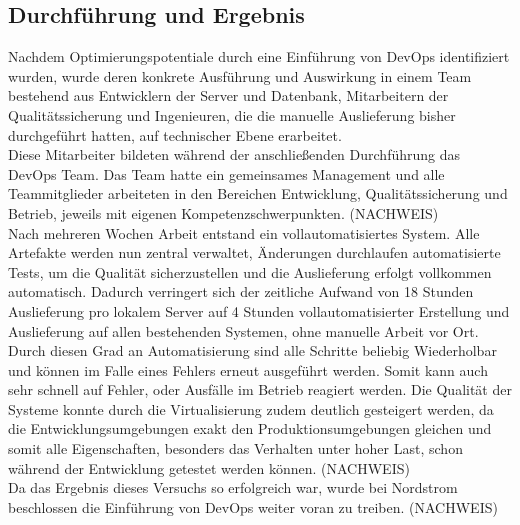 \subsection{Durchführung und Ergebnis}
Nachdem Optimierungspotentiale durch eine Einführung von DevOps identifiziert wurden, wurde deren konkrete Ausführung und Auswirkung in einem Team bestehend aus Entwicklern der Server und Datenbank, Mitarbeitern der Qualitätssicherung und Ingenieuren, die die manuelle Auslieferung bisher durchgeführt hatten, auf technischer Ebene erarbeitet.\\
Diese Mitarbeiter bildeten während der anschließenden Durchführung das DevOps Team. Das Team hatte ein gemeinsames Management und alle Teammitglieder arbeiteten in den Bereichen Entwicklung, Qualitätssicherung und Betrieb, jeweils mit eigenen Kompetenzschwerpunkten. (NACHWEIS)\\
Nach mehreren Wochen Arbeit entstand ein vollautomatisiertes System. Alle Artefakte werden nun zentral verwaltet, Änderungen durchlaufen automatisierte Tests, um die Qualität sicherzustellen und die Auslieferung erfolgt vollkommen automatisch. Dadurch verringert sich der zeitliche Aufwand von 18 Stunden Auslieferung pro lokalem Server auf 4 Stunden vollautomatisierter Erstellung und Auslieferung auf allen bestehenden Systemen, ohne manuelle Arbeit vor Ort. Durch diesen Grad an Automatisierung sind alle Schritte beliebig Wiederholbar und können im Falle eines Fehlers erneut ausgeführt werden. Somit kann auch sehr schnell auf Fehler, oder Ausfälle im Betrieb reagiert werden. Die Qualität der Systeme konnte durch die Virtualisierung zudem deutlich gesteigert werden, da die Entwicklungsumgebungen exakt den Produktionsumgebungen gleichen und somit alle Eigenschaften, besonders das Verhalten unter hoher Last, schon während der Entwicklung getestet werden können. (NACHWEIS)\\
Da das Ergebnis dieses Versuchs so erfolgreich war, wurde bei Nordstrom beschlossen die Einführung von DevOps weiter voran zu treiben. (NACHWEIS)
